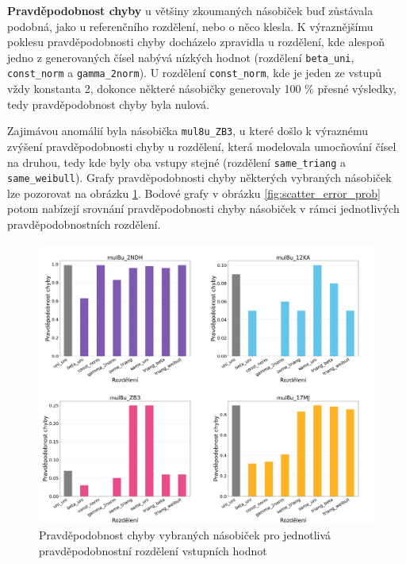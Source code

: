 \pagebreak

\textbf{Pravděpodobnost chyby} u většiny zkoumaných násobiček buď zůstávala podobná, jako u referenčního rozdělení, nebo o něco klesla. K výraznějšímu poklesu pravděpodobnosti chyby docházelo zpravidla u rozdělení, kde alespoň jedno z generovaných čísel nabývá nízkých hodnot (rozdělení \texttt{beta\_uni}, \texttt{const\_norm} a \texttt{gamma\_2norm}). U rozdělení \texttt{const\_norm}, kde je jeden ze vstupů vždy konstanta 2, dokonce některé násobičky generovaly 100 \% přesné výsledky, tedy pravděpodobnost chyby byla nulová. 

Zajimávou anomálií byla násobička \texttt{mul8u\_ZB3}, u které došlo k výraznému zvýšení pravděpodobnosti chyby u rozdělení, která modelovala umocňování čísel na druhou, tedy kde byly oba vstupy stejné (rozdělení \texttt{same\_triang} a \texttt{same\_weibull}). Grafy pravděpodobnosti chyby některých vybraných násobiček lze pozorovat na obrázku \ref{fig:metrics_error_prob}. Bodové grafy v obrázku \ref{fig:scatter_error_prob} potom nabízejí srovnání pravděpodobnosti chyby násobiček v rámci jednotlivých pravděpodobnostních rozdělení.

\begin{figure}[H]
    \centering
    \includegraphics[width=\textwidth]{obrazky-figures/metrics_error_prob.png}
    \caption{Pravděpodobnost chyby vybraných násobiček pro jednotlivá pravděpodobnostní rozdělení vstupních hodnot}
    \label{fig:metrics_error_prob}
\end{figure}

